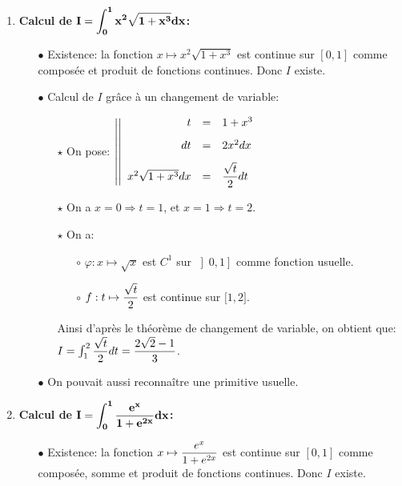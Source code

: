 \documentclass[a4paper, 11pt,reqno]{article}
\begin{document}
\begin{correction}
\begin{enumerate}
		\item \textbf{Calcul de $\mathbf{\displaystyle I=\int_{0}^{1} x^2\sqrt{1+x^3} dx}$:}
		      \begin{itemize}
			      \item[$\bullet$] Existence: la fonction $x\mapsto x^2\sqrt{1+x^3}$ est continue sur $\left\lbrack 0,1 \right\rbrack$ comme compos\'ee et produit de fonctions continues. Donc $I$ existe.
			      \item[$\bullet$] Calcul de $I$ gr\^{a}ce \`{a} un changement de variable:
			            \begin{itemize}
				            \item[$\star$] On pose: $\left| \left|\begin{array}{rll}
						                  t                  & = & 1+x^3\vsec                \\
						                  dt                 & = & 2x^2dx \vsec              \\
						                  x^2\sqrt{1+x^3} dx & = & \ddp\frac{\sqrt{t}}{2} dt
					                  \end{array}\right.\right.$
				            \item[$\star$] On a $x=0 \Rightarrow t=1$, et $x=1 \Rightarrow t= 2$.
				            \item[$\star$] On a:
				                  \begin{itemize}
					                  \item[$\circ$] $\varphi: x\mapsto \sqrt{x}$ est $C^1$ sur $\left\rbrack 0,1 \right\rbrack$ comme fonction usuelle.
					                  \item[$\circ$] $f: t\mapsto   \displaystyle\frac{\sqrt{t}}{2} $ est continue sur $\lbrack 1,2\rbrack$.
				                  \end{itemize}
				                  Ainsi d'apr\`{e}s le th\'eor\`{e}me de changement de variable, on obtient que:
				                  $I=\int_1^{2}  \displaystyle\frac{\sqrt{t}}{2} dt=\displaystyle\frac{2\sqrt{2}-1}{3}$.
			            \end{itemize}
			      \item[$\bullet$] On pouvait aussi reconna\^{i}tre une primitive usuelle.
		      \end{itemize}
		\item \textbf{Calcul de $\mathbf{\displaystyle I=\int_0^1 \displaystyle\frac{e^x}{1+e^{2x}}dx} $:}
		      \begin{itemize}
			      \item[$\bullet$] Existence: la fonction $x\mapsto \displaystyle\frac{e^x}{1+e^{2x}}$ est continue sur $\left\lbrack 0,1 \right\rbrack$ comme compos\'ee, somme et produit de fonctions continues. Donc $I$ existe.

\end{itemize}
\end{enumerate}
\end{correction}
\end{document}
